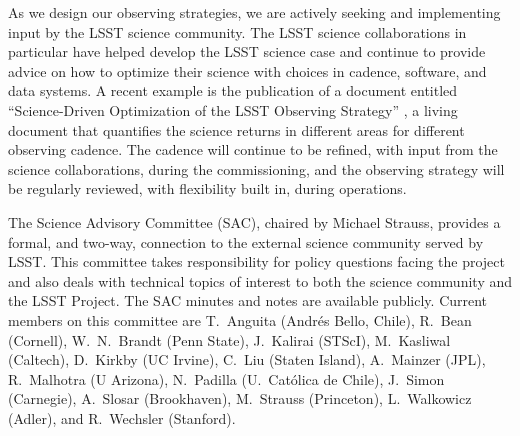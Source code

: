 As we design our observing strategies, we are actively seeking and implementing
input by the LSST science community.  The LSST science collaborations
in particular have helped develop the LSST science case and continue
to provide advice on how to optimize their science with choices in
cadence, software,
and data systems. A recent example is the publication of a document
entitled ``Science-Driven Optimization of the LSST Observing
Strategy'' \citep{2017arXiv170804058L}, a living document that
quantifies the science returns in different areas for different
observing cadence.  The cadence will continue to be refined, with
input from the science collaborations, during the commissioning, and
the observing strategy will be regularly reviewed, with flexibility
built in, during operations.

The Science Advisory Committee (SAC), chaired by Michael Strauss,
provides a formal, and two-way, connection to the external science
community served by LSST. This committee takes responsibility for
policy questions facing the project and also deals with technical
topics of interest to both the science community and the LSST
Project. The SAC minutes and notes are available
publicly. Current members on this committee are T.~Anguita (Andr\'es
Bello, Chile), R.~Bean (Cornell), W.~N.~Brandt
(Penn State), J.~Kalirai (STScI), M.~Kasliwal
(Caltech), D.~Kirkby (UC Irvine), C.~Liu (Staten Island), A.~Mainzer
(JPL), R.~Malhotra (U Arizona),
N.~Padilla (U.\ Cat\'olica de Chile), J.~Simon (Carnegie), A.~Slosar
(Brookhaven), M.~Strauss (Princeton), L.~Walkowicz (Adler),
and R.~Wechsler (Stanford).
